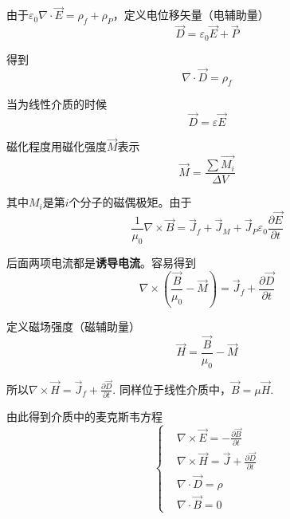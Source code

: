 \documentclass[UTF8]{ctexart}
\begin{document}
    由于$\varepsilon_0 \nabla \cdot \vec{E} = \rho_f +\rho_P$，定义电位移矢量（电辅助量）
    \begin{equation}
        \vec{D} = \varepsilon_0 \vec{E} + \vec{P}
    \end{equation}

\noindent 得到 
\begin{equation}
    \nabla \cdot \vec{D} = \rho_{f}
\end{equation}

\noindent 当为线性介质的时候
\begin{equation}
    \vec{D} = \varepsilon \vec{E}
\end{equation}

    磁化程度用磁化强度$\vec{M}$表示 
    \begin{equation}
        \vec{M} = \frac{\sum \vec{M_i}}{\Delta V}
    \end{equation}

\noindent 其中$M_i$是第$i$个分子的磁偶极矩。由于
\begin{equation}
    \frac{1}{\mu_0} \nabla \times \vec{B} = \vec{J}_f + \vec{J}_M + \vec{J}_P \varepsilon_0 \frac{\partial \vec{E}}{\partial t}
\end{equation}

\noindent 后面两项电流都是\textbf{诱导电流}。容易得到
\begin{equation}
    \nabla \times \left(\frac{\vec{B}}{\mu_0} - \vec{M}\right) = \vec{J}_f + \frac{\partial \vec{D}}{\partial t}
\end{equation}

\noindent 定义磁场强度（磁辅助量）
\begin{equation}
    \vec{H} = \frac{\vec{B}}{\mu_0} - \vec{M}
\end{equation}

\noindent 所以$\nabla \times \vec{H} = \vec{J}_f + \frac{\partial \vec{D}}{\partial t}$. 同样位于线性介质中，$\vec{B} = \mu \vec{H}$.

    由此得到介质中的麦克斯韦方程
    \begin{equation}
        \left \{ \begin{aligned}
            &\nabla \times \vec{E}=-\frac{\partial \vec{B}}{\partial t} \\ &\nabla \times \vec{H}=\vec{J}+\frac{\partial \vec{D}}{\partial t} \\ &\nabla \cdot \vec{D}=\rho \\ &\nabla \cdot \vec{B}=0
        \end{aligned} \right. \label{equ1.1}
    \end{equation}
\end{document}
